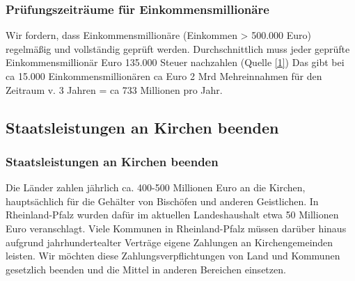 
\subsubsection{Prüfungszeiträume für Einkommensmillionäre}
\abstimmung
Wir fordern, dass Einkommensmillionäre (Einkommen > 500.000 Euro) regelmäßig und vollständig geprüft werden. Durchschnittlich muss jeder geprüfte Einkommensmillionär Euro 135.000 Steuer nachzahlen (Quelle \href{http://www.welt.de/wirtschaft/article128891/Milliarden_Verlust_durch_fehlende_Steuerpruefung.html}{[1]}) Das gibt bei ca 15.000 Einkommensmillionären ca Euro 2 Mrd Mehreinnahmen für den Zeitraum v. 3 Jahren = ca 733 Millionen pro Jahr.
 
\subsection*{Staatsleistungen an Kirchen beenden}

\subsubsection{Staatsleistungen an Kirchen beenden}
\abstimmung
Die Länder zahlen jährlich ca. 400-500 Millionen Euro an die Kirchen, hauptsächlich für die Gehälter von Bischöfen und anderen Geistlichen. In Rheinland-Pfalz wurden dafür im aktuellen Landeshaushalt etwa 50 Millionen Euro veranschlagt. Viele Kommunen in Rheinland-Pfalz müssen darüber hinaus aufgrund jahrhundertealter Verträge eigene Zahlungen an Kirchengemeinden leisten. Wir möchten diese Zahlungsverpflichtungen von Land und Kommunen gesetzlich beenden und die Mittel in anderen Bereichen einsetzen.
